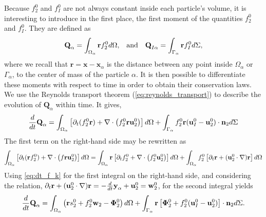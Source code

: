 Because $f_2^0$ and $f_I^0$ are not always constant inside each particle's volume, it is interesting to introduce in the first place, the first moment of the quantities $f_2^0$ and $f_I^0$. 
They are defined as
\begin{align}
    &\textbf{Q}_\alpha 
    = \int_{\Omega_\alpha}  \textbf{r} f_2^0  d\Omega,
    &\text{and}&
    &\textbf{Q}_{I\alpha}
    = \int_{\Gamma_\alpha}  \textbf{r} f_I^0  d\Sigma,
    \label{eq:first_moment_definition}
\end{align}
where we recall that $\textbf{r} = \textbf{x} - \textbf{x}_\alpha$ is the distance between any point inside $\Omega_\alpha$ or $\Gamma_\alpha$, to the center of mass of the particle $\alpha$.
It is then possible to differentiate these moments with respect to time in order to obtain their conservation laws.
We use the Reynolds transport theorem (\ref{eq:reynolds_transport}) to describe the evolution of $\textbf{Q}_\alpha$ within time. 
It gives, 
\begin{equation}
    \frac{d}{dt} \textbf{Q}_\alpha
      =  \int_{\Omega_\alpha} \left[
        \partial_t(  f_2^0\textbf{r})
        + \mathbf{\nabla}\cdot \left(  f_2^0 \textbf{r}\textbf{u}_2^0\right)
    \right] d\Omega 
    + \int_{\Gamma_\alpha}   f_2^0 \textbf{r}  (\textbf{u}_I^0-\textbf{u}_2^0)\cdot \textbf{n}_2 d\Sigma
\end{equation}
The first term on the right-hand side may be rewritten as
\begin{equation}
\int_{\Omega_\alpha}  \left[
        \partial_t(\textbf{r}  f_2^0)+ \mathbf{\nabla}\cdot \left(f \textbf{r} \textbf{u}_2^0\right) 
    \right] d\Omega
    = \int_{\Omega_\alpha} \textbf{r}\left[
        \partial_t f_2^0
        + \mathbf{\nabla}\cdot \left(f_2^0 \textbf{u}_2^0\right)
    \right]  d\Omega
    + \int_{\Omega_\alpha}  f_2^0 \left[
        \partial_t \textbf{r}
        +(\textbf{u}_2^0 \cdot \mathbf{\nabla}) \textbf{r}
    \right] d\Omega
\end{equation}
Using \ref{eq:dt_f_k} for the first integral on the right-hand side, and considering the relation,
$  \partial_t \textbf{r}
+ (\textbf{u}_2^0 \cdot \mathbf{\nabla}) \textbf{r}
= - \frac{d}{dt} \textbf{y}_\alpha  + \textbf{u}_2^0 
= \textbf{w}_2^0$,
for the second integral yields 
\begin{align}
    \frac{d}{dt} \textbf{Q}_\alpha
    = \int_{\Omega_\alpha} \left( 
        \textbf{r} s_2^0  
        + f_2^0  \textbf{w}_2 
        - \bm\Phi_2^0
    \right)  d\Omega
    + \int_{\Gamma_\alpha} \textbf{r} \left[
        \bm\Phi_2^0
        + f_2^0 (\textbf{u}_I^0-\textbf{u}_2^0)
    \right]\cdot \textbf{n}_2  d\Sigma.
    \label{eq:dt_Q_alpha}
\end{align}
